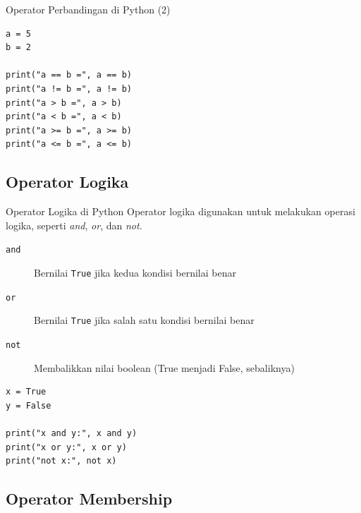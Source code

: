\documentclass[aspectratio=169, table]{beamer}
\begin{document}
\begin{frame}[fragile]{Operator Perbandingan di Python (2)}
\begin{lstlisting}[style=PythonStyle, caption={Kode Python: comparison_operator.py}]
a = 5
b = 2

print("a == b =", a == b)
print("a != b =", a != b)
print("a > b =", a > b)
print("a < b =", a < b)
print("a >= b =", a >= b)
print("a <= b =", a <= b)
\end{lstlisting}
\end{frame}

\subsection{Operator Logika}

\begin{frame}[fragile]{Operator Logika di Python}
Operator logika digunakan untuk melakukan operasi logika, seperti \textit{and}, \textit{or}, dan \textit{not}.
\begin{description}
    \item[\texttt{and}] Bernilai \texttt{True} jika kedua kondisi bernilai benar
    \item[\texttt{or}] Bernilai \texttt{True} jika salah satu kondisi bernilai benar
    \item[\texttt{not}] Membalikkan nilai boolean (True menjadi False, sebaliknya)
\end{description}

\begin{lstlisting}[style=PythonStyle, caption={Kode Python: logical_operator.py}]
x = True
y = False

print("x and y:", x and y)
print("x or y:", x or y)
print("not x:", not x)
\end{lstlisting}
\end{frame}

\subsection{Operator Membership}
\end{document}
